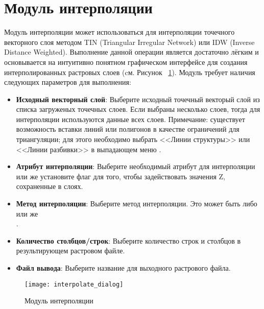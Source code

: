 
\section{Модуль интерполяции}


Модуль интерполяции может использоваться для интерполяции точечного
векторного слоя методом TIN (Triangular Irregular Network) или IDW
(Inverse Distance Weighted). Выполнение данной операции является
достаточно лёгким и основывается на интуитивно понятном графическом
интерфейсе для создания интерполированных растровых слоев (cм. Рисунок~
\ref{fig:interpolation_dialog}). Модуль требует наличия следующих
параметров для выполнения:

\begin{itemize}[label=--]
\item \textbf{Исходный векторный слой}: Выберите исходный точечный
векторый слой из списка загруженых точечных слоев. Если выбраны
несколько слоев, тогда для интерполяции используются данные всех слоев.
Примечание: существует возможность вставки линий или полигонов в
качестве ограничений для триангуляции; для этого необходимо выбрать
<<Линии структуры>> или <<Линии разбивки>> в выпадающем меню
.
\item \textbf{Атрибут интерполяции}: Выберите необходимый атрибут
для интерполяции или же установите флаг
 для того, чтобы
задействовать значения Z, сохраненные в слоях.
\item \textbf{Метод интерполяции}: Выберите метод интерполяции. Это
может быть либо \\
 или же \\
.
\item \textbf{Количество столбцов/строк}: Выберите количество строк и
столбцов в результирующем растровом файле.
\item \textbf{Файл вывода}: Выберите название для выходного растрового
файла.
\end{itemize}

\begin{figure}[ht]
   \centering
   \texttt{[image: interpolate\_dialog]}
   \caption{Модуль интерполяции \wincaption}\label{fig:interpolation_dialog}
\end{figure}

